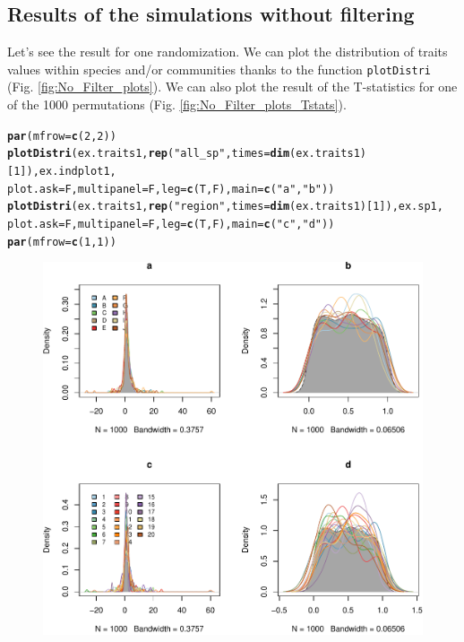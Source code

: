 \documentclass[12pt]{article}\usepackage[]{graphicx}\usepackage[]{color}
\makeatletter
\def\maxwidth{ %
  \ifdim\Gin@nat@width>\linewidth
    \linewidth
  \else
    \Gin@nat@width
  \fi
}
\newcommand{\hlnum}[1]{\textcolor[rgb]{0.686,0.059,0.569}{#1}}%
\newcommand{\hlstr}[1]{\textcolor[rgb]{0.192,0.494,0.8}{#1}}%
\newcommand{\hlstd}[1]{\textcolor[rgb]{0.345,0.345,0.345}{#1}}%
\newcommand{\hlkwc}[1]{\textcolor[rgb]{0.333,0.667,0.333}{#1}}%
\newcommand{\hlkwd}[1]{\textcolor[rgb]{0.737,0.353,0.396}{\textbf{#1}}}%
\newenvironment{kframe}{%
 \def\at@end@of@kframe{}%
 \ifinner\ifhmode%
  \def\at@end@of@kframe{\end{minipage}}%
  \begin{minipage}{\columnwidth}%
 \fi\fi%
 \def\FrameCommand##1{\hskip\@totalleftmargin \hskip-\fboxsep
 \colorbox{shadecolor}{##1}\hskip-\fboxsep
     \hskip-\linewidth \hskip-\@totalleftmargin \hskip\columnwidth}%
 \MakeFramed {\advance\hsize-\width
   \@totalleftmargin\z@ \linewidth\hsize
   \@setminipage}}%
 {\par\unskip\endMakeFramed%
 \at@end@of@kframe}
\newenvironment{knitrout}{}{} %
\makeatother
\begin{document}
  \subsection {Results of the simulations without filtering}
Let's see the result for one randomization. We can plot the distribution of traits values within species and/or communities thanks to the function \texttt{plotDistri} (Fig. \ref{fig:No_Filter_plots}). We can also plot the result of the T-statistics for one of the 1000 permutations (Fig. \ref{fig:No_Filter_plots_Tstats}).

\begin{knitrout}\small
{}\color{fgcolor}\begin{kframe}
\begin{alltt}
\hlkwd{par}\hlstd{(}\hlkwc{mfrow}\hlstd{=}\hlkwd{c}\hlstd{(}\hlnum{2}\hlstd{,} \hlnum{2}\hlstd{))}
\hlkwd{plotDistri}\hlstd{(ex.traits1,} \hlkwd{rep}\hlstd{(}\hlstr{"all_sp"}\hlstd{,} \hlkwc{times} \hlstd{=} \hlkwd{dim}\hlstd{(ex.traits1)[}\hlnum{1}\hlstd{]), ex.indplot1,}
           \hlkwc{plot.ask} \hlstd{= F,} \hlkwc{multipanel} \hlstd{= F,} \hlkwc{leg} \hlstd{=}\hlkwd{c}\hlstd{(T, F),} \hlkwc{main} \hlstd{=} \hlkwd{c}\hlstd{(}\hlstr{"a"}\hlstd{,} \hlstr{"b"}\hlstd{))}
\hlkwd{plotDistri}\hlstd{(ex.traits1,} \hlkwd{rep}\hlstd{(}\hlstr{"region"}\hlstd{,} \hlkwc{times} \hlstd{=} \hlkwd{dim}\hlstd{(ex.traits1)[}\hlnum{1}\hlstd{]), ex.sp1,}
           \hlkwc{plot.ask} \hlstd{= F,} \hlkwc{multipanel} \hlstd{= F,} \hlkwc{leg} \hlstd{=}\hlkwd{c}\hlstd{(T, F),} \hlkwc{main} \hlstd{=} \hlkwd{c}\hlstd{(}\hlstr{"c"}\hlstd{,} \hlstr{"d"}\hlstd{))}
\hlkwd{par}\hlstd{(}\hlkwc{mfrow}\hlstd{=}\hlkwd{c}\hlstd{(}\hlnum{1}\hlstd{,} \hlnum{1}\hlstd{))}
\end{alltt}
\end{kframe}\begin{figure}

{\centering \includegraphics[width=\maxwidth]{figure/No_Filter_plots-1} 

}
\end{figure}
\end{knitrout}
\end{document}
